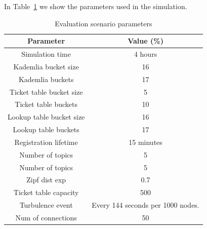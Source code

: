 In Table~\ref{tab:param} we show the parameters used in the simulation. 

\begin{table}[!hbt]
\centering
\scriptsize
\begin{tabular}{|c|c|}%
\hline
Parameter     & Value (\%) \\
\hline
\hline
Simulation time & 4 hours \\%
\hline
Kademlia bucket size & 16 \\%
\hline
Kademlia buckets & 17 \\%
\hline
Ticket table bucket size & 5 \\%
\hline
Ticket table buckets & 10 \\%
\hline
Lookup table bucket size & 16 \\%
\hline
Lookup table buckets & 17 \\%
\hline
Registration lifetime & 15 minutes \\%
\hline
Number of topics & 5 \\%
\hline
Number of topics & 5 \\%
\hline
Zipf dist exp & 0.7 \\%
\hline
Ticket table capacity & 500 \\
\hline
Turbulence event & Every 144 seconds per 1000 nodes. \\%
\hline
Num of connections & 50 \\%
\hline
\bottomrule
\end{tabular}
\vspace{2mm}
\caption{Evaluation scenario parameters}
\label{tab:param}
\vspace{-0.05in}
\end{table}

